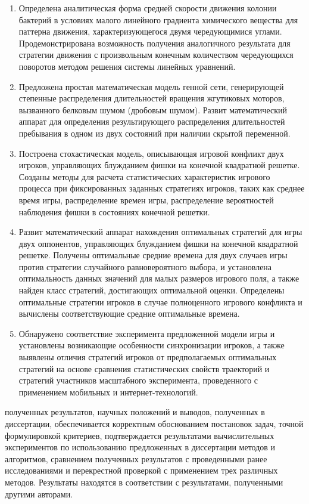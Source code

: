 {}
\begin{enumerate}[beginpenalty=10000] %
    \item Определена аналитическая форма средней скорости движения колонии бактерий в условиях малого линейного градиента химического вещества для паттерна движения, характеризующегося двумя чередующимися углами. Продемонстрирована возможность получения аналогичного результата для стратегии движения с произвольным конечным количеством чередующихся поворотов методом решения системы линейных уравнений.
    \item Предложена простая математическая модель генной сети, генерирующей степенные распределения длительностей вращения жгутиковых моторов, вызванного белковым шумом (дробовым шумом). Развит математический аппарат для определения результирующего распределения длительностей пребывания в одном из двух состояний при наличии скрытой переменной. 
    \item Построена стохастическая модель, описывающая игровой конфликт двух игроков, управляющих блужданием фишки на конечной квадратной решетке. Созданы методы для расчета статистических характеристик игрового процесса при фиксированных заданных стратегиях игроков, таких как среднее время игры, распределение времен игры, распределение вероятностей наблюдения фишки в состояниях конечной решетки. 
    \item Развит математический аппарат нахождения оптимальных стратегий для игры двух оппонентов, управляющих блужданием фишки на конечной квадратной решетке. Получены оптимальные средние времена для двух случаев игры против стратегии случайного равновероятного выбора, и установлена оптимальность данных значений для малых размеров игрового поля, а также найден класс стратегий, достигающих оптимальной оценки. Определены оптимальные стратегии игроков в случае полноценного игрового конфликта и вычислены соответствующие средние оптимальные времена.
    \item Обнаружено соответствие эксперимента предложенной модели игры и установлены возникающие особенности синхронизации игроков, а также выявлены отличия стратегий игроков от предполагаемых оптимальных стратегий на основе сравнения статистических свойств траекторий и стратегий участников масштабного эксперимента, проведенного с применением мобильных и интернет-технологий.
\end{enumerate}

{\reliability} полученных результатов, научных положений и выводов,
полученных в диссертации, обеспечивается корректным обоснованием
постановок задач, точной формулировкой критериев, подтверждается результатами
вычислительных экспериментов по использованию предложенных в
диссертации методов и алгоритмов, сравнением полученных результатов с
проведенными ранее исследованиями и перекрестной проверкой с применением трех различных методов.
Результаты находятся в соответствии с результатами, полученными другими авторами.

